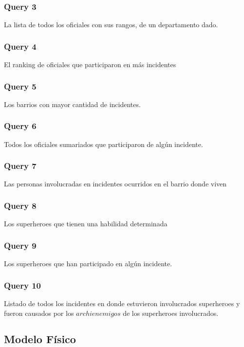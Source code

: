 \subsubsection{Query 3}
La lista de todos los oficiales con sus rangos, de un departamento dado.



\subsubsection{Query 4}
El ranking de oficiales que participaron en más incidentes



\subsubsection{Query 5}
Los barrios con mayor cantidad de incidentes.



\subsubsection{Query 6}
Todos los oficiales sumariados que participaron de algún incidente.



\subsubsection{Query 7}
Las personas involucradas en incidentes ocurridos en el barrio donde viven



\subsubsection{Query 8}
Los superheroes que tienen una habilidad determinada



\subsubsection{Query 9}
Los superheroes que han participado en algún incidente.



\subsubsection{Query 10}
Listado de todos los incidentes en donde estuvieron involucrados superheroes
y fueron causados por los $archienemigos$ de los superheroes involucrados.



\subsection{Modelo Físico}

